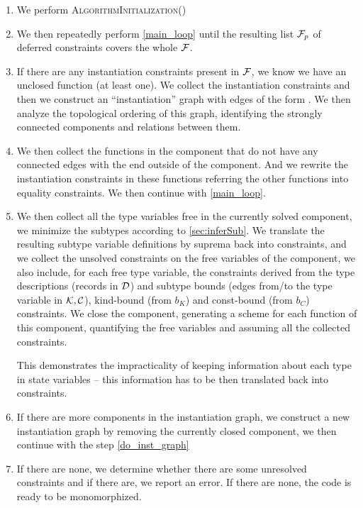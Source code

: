 \begin{enumerate}
    \item We perform \textsc{AlgorithmInitialization()}

    \item We then repeatedly perform \cref{main_loop} until the resulting list $\mathcal F_p$ of deferred constraints covers the whole $\mathcal{F}$.

    \item If there are any instantiation constraints present in $\mathcal F$, we know we have an unclosed function (at least one). We collect the instantiation constraints and then we construct an ``instantiation'' graph with edges of the form . We then analyze the topological ordering of this graph, identifying the strongly connected components and relations between them.

    \item We then collect the functions in the component that do not have any connected edges with the  end outside of the component. And we rewrite the instantiation constraints in these functions referring the other functions into equality constraints. We then continue with \cref{main_loop}. \label{do_inst_graph}

    \item We then collect all the type variables free in the currently solved component, we minimize the subtypes according to \cref{sec:inferSub}. We translate the resulting subtype variable definitions by suprema back into constraints, and we collect the unsolved constraints on the free variables of the component, we also include, for each free type variable, the constraints derived from the type descriptions (records in $\mathcal{D}$) and subtype bounds (edges from/to the type variable in $\mathcal K, \mathcal C$), kind-bound (from $b_K$) and const-bound (from $b_C$) constraints. We close the component, generating a scheme for each function of this component, quantifying the free variables and assuming all the collected constraints. \label{closing}

    This demonstrates the impracticality of keeping information about each type in state variables -- this information has to be then translated back into constraints.

    \item If there are more components in the instantiation graph, we construct a new instantiation graph by removing the currently closed component, we then continue with the step \ref{do_inst_graph}

    \item If there are none, we determine whether there are some unresolved constraints and if there are, we report an error. If there are none, the code is ready to be monomorphized.
\end{enumerate}

